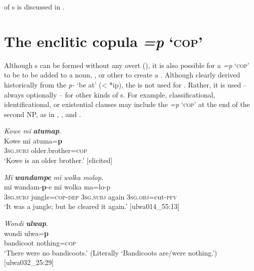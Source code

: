  of s is discussed in .


\section{The enclitic copula \textit{=p} ‘\textsc{cop}’}\label{sec:10.3}


Although s can be formed without any overt  (), it is also possible for a  \textit{=p} ‘\textsc{cop}’ to be to be added to a noun, , or other  to create a . Although clearly derived historically from the  \textit{p-} ‘be at’ (<  *ip), the  is not used for . Rather, it is used -- always optionally -- for other kinds of s. For example,  classificational,  identificational, or  existential clauses may include the  \textit{=p} ‘\textsc{cop}’ at the end of the second NP, as in , , and .

\ea%
    \label{ex:pred:34}
          \textit{Kowe mï} \textbf{\textit{atumap}}.\\
\gll Kowe  mï      atuma=\textbf{p}\\
    [name]  \textsc{3sg.subj}  older.brother=\textsc{cop}\\
\glt `Kowe is an older brother.’ [elicited]
\z

\ea%
    \label{ex:pred:35}
          \textit{Mï} \textbf{\textit{wandampe}} \textit{mï wolka molop.}\\
\gll    mï      wandam-\textbf{p}{}-e    mï      wolka  ma=lo-p\\
    3\textsc{sg.subj}  jungle=\textsc{cop-dep}  3\textsc{sg.subj}  again  3\textsc{sg.obj}=cut\textsc{{}-pfv}\\
\glt `It was a jungle; but he cleared it again.’ [ulwa014\_55:13]
\z

\ea%
    \label{ex:pred:36}
          \textit{Wondi} \textbf{\textit{ulwap}}.\\
\gll wondi    ulwa=\textbf{p}\\
    bandicoot  nothing=\textsc{cop}\\
\glt `There were no bandicoots.’ (Literally ‘Bandicoots are/were nothing.’) [ulwa032\_25:29]
\z

